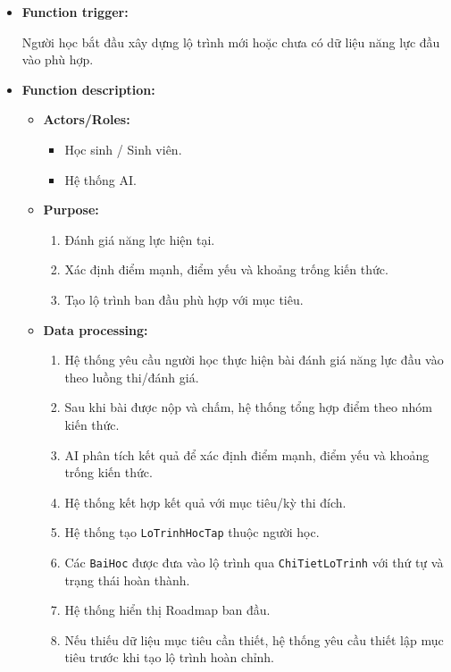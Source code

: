 \documentclass[12pt,a4paper,oneside]{report}
\begin{document}
\begin{itemize}

    \item \textbf{Function trigger:}

    Người học bắt đầu xây dựng lộ trình mới hoặc chưa có dữ liệu năng lực đầu vào phù hợp.

    \item \textbf{Function description:}

    \begin{itemize}

        \item \textbf{Actors/Roles:}
        \begin{itemize}
            \item Học sinh / Sinh viên.
            \item Hệ thống AI.
        \end{itemize}

        \item \textbf{Purpose:}
        \begin{enumerate}
            \item Đánh giá năng lực hiện tại.
            \item Xác định điểm mạnh, điểm yếu và khoảng trống kiến thức.
            \item Tạo lộ trình ban đầu phù hợp với mục tiêu.
        \end{enumerate}

        \item \textbf{Data processing:}
        \begin{enumerate}
            \item Hệ thống yêu cầu người học thực hiện bài đánh giá năng lực đầu vào theo luồng thi/đánh giá.
            \item Sau khi bài được nộp và chấm, hệ thống tổng hợp điểm theo nhóm kiến thức.
            \item AI phân tích kết quả để xác định điểm mạnh, điểm yếu và khoảng trống kiến thức.
            \item Hệ thống kết hợp kết quả với mục tiêu/kỳ thi đích.
            \item Hệ thống tạo \texttt{LoTrinhHocTap} thuộc người học.
            \item Các \texttt{BaiHoc} được đưa vào lộ trình qua \texttt{ChiTietLoTrinh} với thứ tự và trạng thái hoàn thành.
            \item Hệ thống hiển thị Roadmap ban đầu.
            \item Nếu thiếu dữ liệu mục tiêu cần thiết, hệ thống yêu cầu thiết lập mục tiêu trước khi tạo lộ trình hoàn chỉnh.
        \end{enumerate}


\end{itemize}
\end{itemize}
\end{document}
